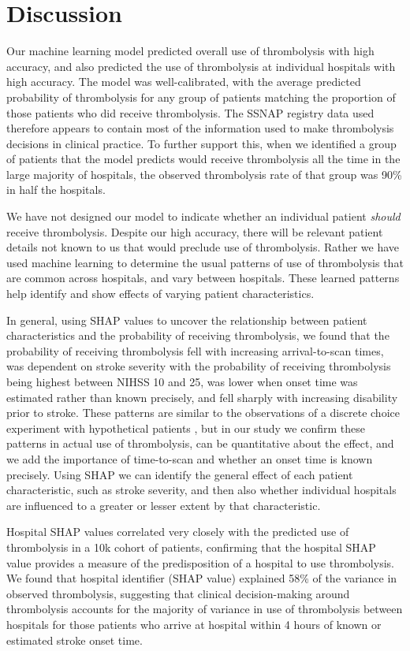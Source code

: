\section{Discussion}

Our machine learning model predicted overall use of thrombolysis with high accuracy, and also predicted the use of thrombolysis at individual hospitals with high accuracy. The model was well-calibrated, with the average predicted probability of thrombolysis for any group of patients matching the proportion of those patients who did receive thrombolysis. The SSNAP registry data used therefore appears to contain most of the information used to make thrombolysis decisions in clinical practice. To further support this, when we identified a group of patients that the model predicts would receive thrombolysis all the time in the large majority of hospitals, the observed thrombolysis rate of that group was 90\% in half the hospitals.

We have not designed our model to indicate whether an individual patient \emph{should} receive thrombolysis. Despite our high accuracy, there will be relevant patient details not known to us that would preclude use of thrombolysis. Rather we have used machine learning to determine the usual patterns of use of thrombolysis that are common across hospitals, and vary between hospitals. These learned patterns help identify and show effects of varying patient characteristics.

In general, using SHAP values to uncover the relationship between patient characteristics and the probability of receiving thrombolysis, we found that the probability of receiving thrombolysis fell with increasing arrival-to-scan times, was dependent on stroke severity with the probability of receiving thrombolysis being highest between NIHSS 10 and 25, was lower when onset time was estimated rather than known precisely, and fell sharply with increasing disability prior to stroke. These patterns are similar to the observations of a discrete choice experiment with hypothetical patients \cite{de_brun_factors_2018}, but in our study we confirm these patterns in actual use of thrombolysis, can be quantitative about the effect, and we add the importance of time-to-scan and whether an onset time is known precisely. Using SHAP we can identify the general effect of each patient characteristic, such as stroke severity, and then also whether individual hospitals are influenced to a greater or lesser extent by that characteristic.

Hospital SHAP values correlated very closely with the predicted use of thrombolysis in a 10k cohort of patients, confirming that the hospital SHAP value provides a measure of the predisposition of a hospital to use thrombolysis. We found that hospital identifier (SHAP value)  explained 58\% of the variance in observed thrombolysis, suggesting that clinical decision-making around thrombolysis accounts for the majority of variance in use of thrombolysis between hospitals for those patients who arrive at hospital within 4 hours of known or estimated stroke onset time. 

